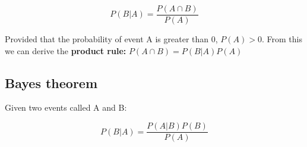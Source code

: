 \begin{equation}
    P(B|A) = \frac{P(A \cap B)} {P(A)} 
\end{equation}

Provided that the probability of event A is greater than 0, $P(A) > 0$.
From this we can derive the \textbf{product rule:} $P(A \cap B) = P(B|A)P(A)$

\subsection{Bayes theorem}
Given two events called A and B:

\begin{equation}
    P(B|A) = \frac{P(A|B)P(B)} {P(A)} 
\end{equation}


